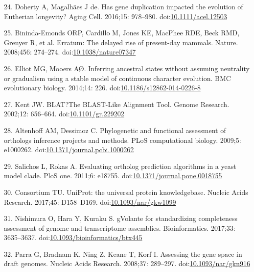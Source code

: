 \documentclass[]{elsarticle} %
\begin{document}
\leavevmode\hypertarget{ref-Doherty2016}{}%
24. Doherty A, Magalhães J de. Has gene duplication impacted the
evolution of Eutherian longevity? Aging Cell. 2016;15: 978--980.
doi:\href{https://doi.org/10.1111/acel.12503}{10.1111/acel.12503}

\leavevmode\hypertarget{ref-Bininda-Emonds2008}{}%
25. Bininda-Emonds ORP, Cardillo M, Jones KE, MacPhee RDE, Beck RMD,
Grenyer R, et al. Erratum: The delayed rise of present-day mammals.
Nature. 2008;456: 274--274.
doi:\href{https://doi.org/10.1038/nature07347}{10.1038/nature07347}

\leavevmode\hypertarget{ref-ElliotAndMooers2014}{}%
26. Elliot MG, Mooers AØ. Inferring ancestral states without assuming
neutrality or gradualism using a stable model of continuous character
evolution. BMC evolutionary biology. 2014;14: 226.
doi:\href{https://doi.org/10.1186/s12862-014-0226-8}{10.1186/s12862-014-0226-8}

\leavevmode\hypertarget{ref-blat}{}%
27. Kent JW. BLAT?The BLAST-Like Alignment Tool. Genome Research.
2002;12: 656--664.
doi:\href{https://doi.org/10.1101/gr.229202}{10.1101/gr.229202}

\leavevmode\hypertarget{ref-AltenhoffAndDessimoz2009}{}%
28. Altenhoff AM, Dessimoz C. Phylogenetic and functional assessment of
orthologs inference projects and methods. PLoS computational biology.
2009;5: e1000262.
doi:\href{https://doi.org/10.1371/journal.pcbi.1000262}{10.1371/journal.pcbi.1000262}

\leavevmode\hypertarget{ref-SalichosAndRokas2011}{}%
29. Salichos L, Rokas A. Evaluating ortholog prediction algorithms in a
yeast model clade. PloS one. 2011;6: e18755.
doi:\href{https://doi.org/10.1371/journal.pone.0018755}{10.1371/journal.pone.0018755}

\leavevmode\hypertarget{ref-uniprot}{}%
30. Consortium TU. UniProt: the universal protein knowledgebase. Nucleic
Acids Research. 2017;45: D158--D169.
doi:\href{https://doi.org/10.1093/nar/gkw1099}{10.1093/nar/gkw1099}

\leavevmode\hypertarget{ref-gVolante}{}%
31. Nishimura O, Hara Y, Kuraku S. gVolante for standardizing
completeness assessment of genome and transcriptome assemblies.
Bioinformatics. 2017;33: 3635--3637.
doi:\href{https://doi.org/10.1093/bioinformatics/btx445}{10.1093/bioinformatics/btx445}

\leavevmode\hypertarget{ref-CEGMA}{}%
32. Parra G, Bradnam K, Ning Z, Keane T, Korf I. Assessing the gene
space in draft genomes. Nucleic Acids Research. 2008;37: 289--297.
doi:\href{https://doi.org/10.1093/nar/gkn916}{10.1093/nar/gkn916}
\end{document}
